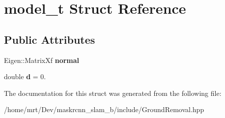 \hypertarget{structmodel__t}{}\section{model\+\_\+t Struct Reference}
\label{structmodel__t}
\subsection*{Public Attributes}
\begin{DoxyCompactItemize}
\item 
\mbox{\label{structmodel__t_a1cf8afe0c8817c653883d79fd73e843d}} 
Eigen\+::\+Matrix\+Xf {\bfseries normal}
\item 
\mbox{\label{structmodel__t_a1aa5040f5b3dcea38dae4842d4f77952}} 
double {\bfseries d} = 0.
\end{DoxyCompactItemize}


The documentation for this struct was generated from the following file\+:\begin{DoxyCompactItemize}
\item 
/home/mrt/\+Dev/maskrcnn\+\_\+slam\+\_\+b/include/Ground\+Removal.\+hpp\end{DoxyCompactItemize}
